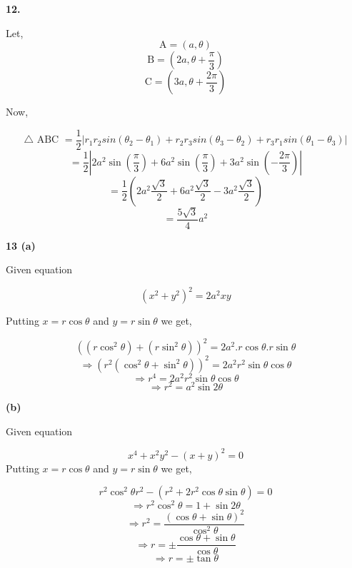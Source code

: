 \documentclass{article}
\begin{document}
\begin{flushleft}
\textbf{12. }\par
\vspace{0.5cm}
Let,
\[\text{A}=(a , \theta)\]
\[\text{B}=(2a , \theta+\frac{\pi}{3})\]
\[\text{C}=(3a , \theta+\frac{2\pi}{3})\]\par
Now,\par
\[\text{$\triangle$ ABC }=\frac{1}{2}|r_1 r_2 sin (\theta_2 -\theta_1)+r_2 r_3 sin (\theta_3 -\theta_2)+r_3 r_1 sin (\theta_1 -\theta_3)|\]
\[=\frac{1}{2}|2a^{2}\sin{(\frac{\pi}{3})}+6a^{2}\sin{(\frac{\pi}{3})}+3a^{2}\sin{(-\frac{2\pi}{3})}|\]
\[=\frac{1}{2}(2a^{2}\frac{\sqrt{3}}{2}+6a^{2}\frac{\sqrt{3}}{2}-3a^{2}\frac{\sqrt{3}}{2})\]
\[=\frac{5\sqrt{3}}{4}a^{2}\]\par
\vspace{1cm}

\textbf{13 \hspace{0.4cm}(a)}\par
\vspace{0.5cm}
Given equation\par
\[(x^{2}+y^{2})^{2}=2a^{2}xy\]\par
Putting $x = r \cos \theta $ and $y = r \sin \theta$ we get,\par
\[((r \cos^{2}\theta)+(r \sin^{2}\theta))^{2} = 2 a^{2}. r \cos{\theta} . r \sin{\theta}\]
\[\Longrightarrow (r^{2}(\cos^{2}{\theta} + \sin^{2}{\theta}))^{2} = 2a^{2}r^{2} \sin{\theta}\cos{\theta}\]
\[\Longrightarrow r^{4} = 2 a^{2}r^{2} \sin{\theta}\cos{\theta}\]
\[\Longrightarrow r^{2} = a^{2} \sin{2\theta}\]\par
\vspace{1cm}
\textbf{\hspace{1cm}(b)}\par
\vspace{0.5cm}
Given equation\par
\[x^4 + x^2y^2 - (x+y)^2 = 0\]
Putting $x = r \cos \theta $ and $y = r \sin \theta$ we get,\par
\[r^{2} \cos^{2}\theta r^{2} - (r^{2}+2r^{2} \cos\theta \sin\theta) = 0\]
\[\Longrightarrow r^{2} \cos^{2}\theta = 1 + \sin{2\theta}\]
\[\Longrightarrow r^{2}=\frac{(\cos\theta + \sin \theta)^{2}}{\cos^{2}\theta}\]
\[\Longrightarrow r = \pm \frac{\cos \theta + \sin \theta}{\cos \theta}\]
\[\Longrightarrow r = \pm \tan{\theta}\]\par
\newpage


\end{flushleft}
\end{document}
